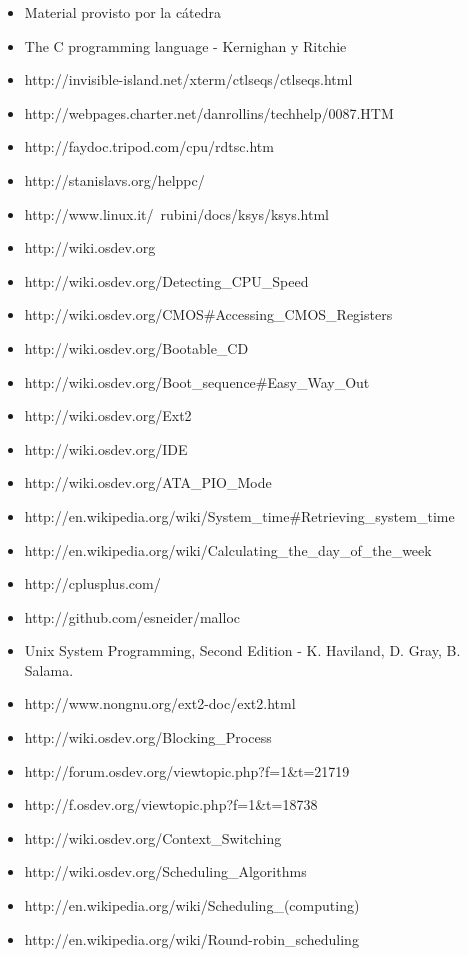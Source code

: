 \documentclass[a4paper,10pt]{article}
\begin{document}
\begin{itemize}
  \item Material provisto por la cátedra
  \item The C programming language - Kernighan y Ritchie
  \item http://invisible-island.net/xterm/ctlseqs/ctlseqs.html
  \item http://webpages.charter.net/danrollins/techhelp/0087.HTM
  \item http://faydoc.tripod.com/cpu/rdtsc.htm
  \item http://stanislavs.org/helppc/
  \item http://www.linux.it/~rubini/docs/ksys/ksys.html
  \item http://wiki.osdev.org
  \item http://wiki.osdev.org/Detecting\_CPU\_Speed
  \item	http://wiki.osdev.org/CMOS\#Accessing\_CMOS\_Registers
  \item http://wiki.osdev.org/Bootable\_CD
  \item http://wiki.osdev.org/Boot\_sequence\#Easy\_Way\_Out
  \item http://wiki.osdev.org/Ext2
  \item http://wiki.osdev.org/IDE
  \item http://wiki.osdev.org/ATA\_PIO\_Mode
  \item http://en.wikipedia.org/wiki/System\_time\#Retrieving\_system\_time
  \item http://en.wikipedia.org/wiki/Calculating\_the\_day\_of\_the\_week
  \item http://cplusplus.com/
  \item http://github.com/esneider/malloc
  \item Unix System Programming, Second Edition - K. Haviland, D. Gray, B. Salama.
  \item http://www.nongnu.org/ext2-doc/ext2.html
  \item http://wiki.osdev.org/Blocking\_Process
  \item http://forum.osdev.org/viewtopic.php?f=1\&t=21719
  \item http://f.osdev.org/viewtopic.php?f=1\&t=18738
  \item http://wiki.osdev.org/Context\_Switching
  \item http://wiki.osdev.org/Scheduling\_Algorithms
  \item http://en.wikipedia.org/wiki/Scheduling\_(computing)
  \item http://en.wikipedia.org/wiki/Round-robin\_scheduling

\end{itemize}
\end{document}
